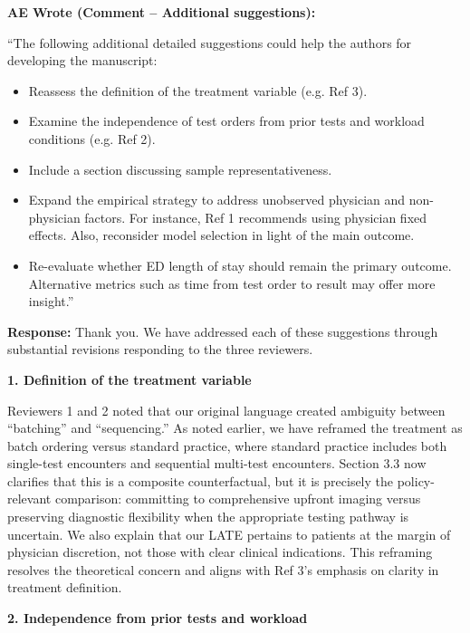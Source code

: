 \documentclass[11pt]{article}
\newenvironment{quote2}
{ \bigskip
\noindent
         \small\em
         \baselineskip=14pt
}
\newcommand{\1}{\hbox{\rm 1\kern-.35em 1}}
\begin{document}
\begin{quote2}
\textbf{AE Wrote (Comment – Additional suggestions):} 

\noindent``The following additional detailed suggestions could help the authors for developing the manuscript:

\begin{itemize}
    \item Reassess the definition of the treatment variable (e.g. Ref 3).
    \item Examine the independence of test orders from prior tests and workload conditions (e.g. Ref 2).
    \item Include a section discussing sample representativeness.
    \item Expand the empirical strategy to address unobserved physician and non-physician factors. For instance, Ref 1 recommends using physician fixed effects. Also, reconsider model selection in light of the main outcome.
    \item Re-evaluate whether ED length of stay should remain the primary outcome. Alternative metrics such as time from test order to result may offer more insight.''
\end{itemize}

\end{quote2}

\noindent\textbf{Response:} \color{blue}Thank you. We have addressed each of these suggestions through substantial revisions responding to the three reviewers.

\textbf{1. Definition of the treatment variable}

Reviewers 1 and 2 noted that our original language created ambiguity between ``batching'' and ``sequencing.'' As noted earlier, we have reframed the treatment as batch ordering versus standard practice, where standard practice includes both single-test encounters and sequential multi-test encounters. Section 3.3 now clarifies that this is a composite counterfactual, but it is precisely the policy-relevant comparison: committing to comprehensive upfront imaging versus preserving diagnostic flexibility when the appropriate testing pathway is uncertain. We also explain that our LATE pertains to patients at the margin of physician discretion, not those with clear clinical indications. This reframing resolves the theoretical concern and aligns with Ref 3’s emphasis on clarity in treatment definition.

\textbf{2. Independence from prior tests and workload}
\end{document}
